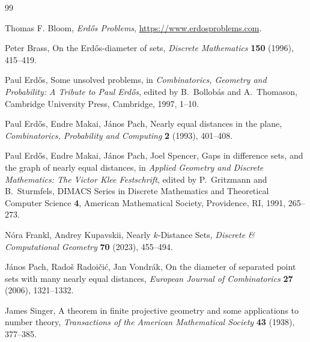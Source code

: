 \documentclass[twoside, reqno, 12pt]{amsart}
\theoremstyle{definition}
\theoremstyle{remark}
\begin{document}
\begin{thebibliography}{99}

Thomas F. Bloom, \emph{Erd\H{o}s Problems}, \url{https://www.erdosproblems.com}.

Peter Brass,
On the Erd\H{o}s-diameter of sets,
\emph{Discrete Mathematics} \textbf{150} (1996), 415--419.

Paul Erd\H{o}s,
Some unsolved problems,
in \emph{Combinatorics, Geometry and Probability: A Tribute to Paul
Erd\H{o}s}, edited by B.~Bollob\'as and A.~Thomason,
Cambridge University Press, Cambridge, 1997, 1--10.

Paul Erd\H{o}s, Endre Makai, J\'anos Pach,
Nearly equal distances in the plane,
\emph{Combinatorics, Probability and Computing} \textbf{2} (1993), 401--408.

Paul Erd\H{o}s, Endre Makai, J\'anos Pach, Joel Spencer,
Gaps in difference sets, and the graph of nearly equal distances,
in \emph{Applied Geometry and Discrete Mathematics: The Victor Klee Festschrift},
edited by P.~Gritzmann and B.~Sturmfels,
DIMACS Series in Discrete Mathematics and Theoretical Computer Science
\textbf{4}, American Mathematical Society, Providence, RI, 1991, 265--273.

N\'ora Frankl, Andrey Kupavskii,
Nearly $k$-Distance Sets,
\emph{Discrete \& Computational Geometry} \textbf{70} (2023), 455--494.

J\'anos Pach, Rado\v{s} Radoi\v{c}i\'c, Jan Vondr\'ak,
On the diameter of separated point sets with many nearly equal distances,
\emph{European Journal of Combinatorics} \textbf{27} (2006), 1321--1332.

James Singer,
A theorem in finite projective geometry and some applications to
number theory,
\emph{Transactions of the American Mathematical Society} \textbf{43}
(1938), 377--385.

\end{thebibliography}
\end{document}
